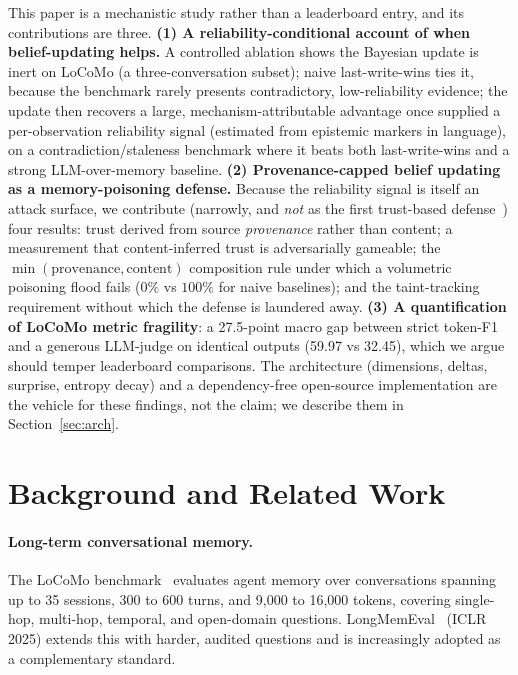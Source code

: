 \documentclass[11pt,a4paper,twocolumn]{article}
\begin{document}
This paper is a mechanistic study rather than a leaderboard entry, and its
contributions are three. \textbf{(1) A reliability-conditional account of when
belief-updating helps.} A controlled ablation shows the Bayesian update is inert
on LoCoMo (a three-conversation subset); naive last-write-wins ties it, because
the benchmark rarely presents contradictory, low-reliability evidence; the update
then recovers a large, mechanism-attributable advantage once supplied a
per-observation reliability signal (estimated from epistemic markers in language),
on a contradiction/staleness benchmark where it beats both last-write-wins and a
strong LLM-over-memory baseline. \textbf{(2) Provenance-capped belief updating as a
memory-poisoning defense.} Because the reliability signal is itself an attack
surface, we contribute (narrowly, and \emph{not} as the first trust-based
defense~\citep{mempoison2026}) four results: trust derived from source
\emph{provenance} rather than content; a measurement that content-inferred trust is
adversarially gameable; the $\min(\text{provenance},\text{content})$ composition
rule under which a volumetric poisoning flood fails ($0\%$ vs $100\%$ for naive
baselines); and the taint-tracking requirement without which the defense is
laundered away. \textbf{(3) A quantification of LoCoMo metric fragility}: a
27.5-point macro gap between strict token-F1 and a generous LLM-judge on identical
outputs (59.97 vs 32.45), which we argue should temper leaderboard comparisons.
The architecture (dimensions, deltas, surprise, entropy decay) and a
dependency-free open-source implementation are the vehicle for these findings, not
the claim; we describe them in Section~\ref{sec:arch}.

\section{Background and Related Work}

\paragraph{Long-term conversational memory.}
The LoCoMo benchmark~\citep{maharana2024locomo} evaluates agent memory over
conversations spanning up to 35 sessions, 300 to 600 turns, and 9,000 to
16,000 tokens, covering single-hop, multi-hop, temporal, and open-domain
questions. LongMemEval~\citep{wu2025longmemeval} (ICLR 2025) extends this
with harder, audited questions and is increasingly adopted as a complementary
standard.
\end{document}
